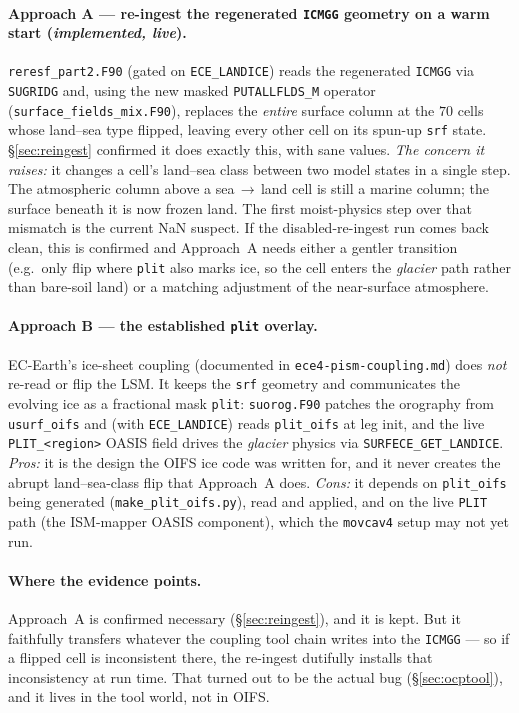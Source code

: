 \documentclass[11pt,a4paper]{article}
\newcommand{\code}[1]{\texttt{\small #1}}
\newcommand{\file}[1]{\texttt{\footnotesize #1}}
\begin{document}
\paragraph{Approach A --- re-ingest the regenerated \code{ICMGG} geometry on a warm start
\textnormal{(\emph{implemented, live})}.} \file{reresf\_part2.F90} (gated on
\code{ECE\_LANDICE}) reads the regenerated \code{ICMGG} via \code{SUGRIDG} and, using the
new masked \code{PUTALLFLDS\_M} operator (\file{surface\_fields\_mix.F90}), replaces the
\emph{entire} surface column at the $70$ cells whose land--sea type flipped, leaving every
other cell on its spun-up \code{srf} state. \S\ref{sec:reingest} confirmed it does exactly
this, with sane values. \emph{The concern it raises:} it changes a cell's land--sea class
between two model states in a single step. The atmospheric column above a sea\,$\to$\,land
cell is still a marine column; the surface beneath it is now frozen land. The first
moist-physics step over that mismatch is the current NaN suspect. If the disabled-re-ingest
run comes back clean, this is confirmed and Approach~A needs either a gentler transition
(e.g.\ only flip where \code{plit} also marks ice, so the cell enters the \emph{glacier}
path rather than bare-soil land) or a matching adjustment of the near-surface atmosphere.

\paragraph{Approach B --- the established \code{plit} overlay.} EC-Earth's ice-sheet
coupling (documented in \file{ece4-pism-coupling.md}) does \emph{not} re-read or flip the
LSM. It keeps the \code{srf} geometry and communicates the evolving ice as a fractional
mask \code{plit}: \file{suorog.F90} patches the orography from \code{usurf\_oifs} and (with
\code{ECE\_LANDICE}) reads \code{plit\_oifs} at leg init, and the live \code{PLIT\_<region>}
OASIS field drives the \emph{glacier} physics via \code{SURFECE\_GET\_LANDICE}. \emph{Pros:}
it is the design the OIFS ice code was written for, and it never creates the abrupt
land--sea-class flip that Approach~A does. \emph{Cons:} it depends on \code{plit\_oifs}
being generated (\code{make\_plit\_oifs.py}), read and applied, and on the live \code{PLIT}
path (the ISM-mapper OASIS component), which the \code{movcav4} setup may not yet run.

\paragraph{Where the evidence points.} Approach~A is confirmed necessary
(\S\ref{sec:reingest}), and it is kept. But it faithfully transfers whatever the coupling
tool chain writes into the \code{ICMGG} --- so if a flipped cell is inconsistent there, the
re-ingest dutifully installs that inconsistency at run time. That turned out to be the
actual bug (\S\ref{sec:ocptool}), and it lives in the tool world, not in OIFS.
\end{document}
